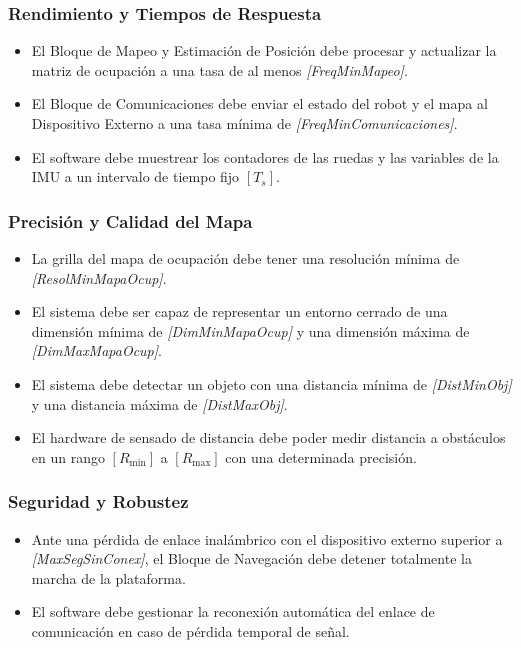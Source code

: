 \subsubsection{Rendimiento y Tiempos de Respuesta}
\begin{itemize}
    \item El Bloque de Mapeo y Estimación de Posición debe procesar y actualizar la matriz de ocupación a una tasa de al menos \textit{[FreqMinMapeo]}.
    \item El Bloque de Comunicaciones debe enviar el estado del robot y el mapa al Dispositivo Externo a una tasa mínima de \textit{[FreqMinComunicaciones]}.
    \item El software debe muestrear los contadores de las ruedas y las variables de la IMU a un intervalo de tiempo fijo $[T_s]$.
\end{itemize}

\subsubsection{Precisión y Calidad del Mapa}
\begin{itemize}
    \item La grilla del mapa de ocupación debe tener una resolución mínima de \textit{[ResolMinMapaOcup]}.
    \item El sistema debe ser capaz de representar un entorno cerrado de una dimensión mínima de \textit{[DimMinMapaOcup]} y una dimensión máxima de \textit{[DimMaxMapaOcup]}.
    \item El sistema debe detectar un objeto con una distancia mínima de \textit{[DistMinObj]} y una distancia máxima de \textit{[DistMaxObj]}.
    \item El hardware de sensado de distancia debe poder medir distancia a obstáculos en un rango $[R_{\text{min}}]$ a $[R_{\text{max}}]$ con una determinada precisión.
\end{itemize}

\subsubsection{Seguridad y Robustez}
\begin{itemize}
    \item Ante una pérdida de enlace inalámbrico con el dispositivo externo superior a \textit{[MaxSegSinConex]}, el Bloque de Navegación debe detener totalmente la marcha de la plataforma.
    \item El software debe gestionar la reconexión automática del enlace de comunicación en caso de pérdida temporal de señal.
\end{itemize}

